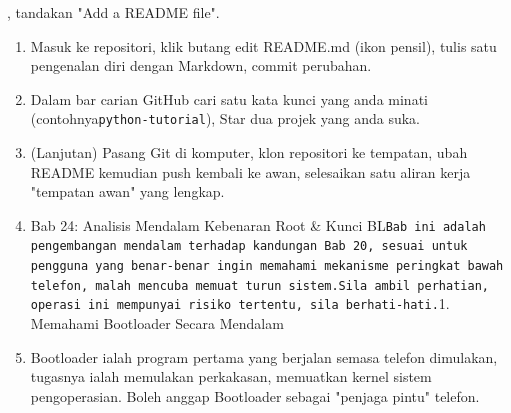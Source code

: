 \begin{tcbpractice}{, tandakan "Add a README file".}
\begin{enumerate}
  \item Masuk ke repositori, klik butang edit README.md (ikon pensil), tulis satu pengenalan diri dengan Markdown, commit perubahan.
  \item Dalam bar carian GitHub cari satu kata kunci yang anda minati (contohnya\texttt{python-\allowbreak tutorial}), Star dua projek yang anda suka.
  \item (Lanjutan) Pasang Git di komputer, klon repositori ke tempatan, ubah README kemudian push kembali ke awan, selesaikan satu aliran kerja "tempatan awan" yang lengkap.
  \item Bab 24: Analisis Mendalam Kebenaran Root \& Kunci BL\texttt{Bab ini adalah pengembangan mendalam terhadap kandungan Bab 20, sesuai untuk pengguna yang benar-\allowbreak benar ingin memahami mekanisme peringkat bawah telefon, malah mencuba memuat turun sistem.\allowbreak  Sila ambil perhatian, operasi ini mempunyai risiko tertentu, sila berhati-\allowbreak hati.\allowbreak }1. Memahami Bootloader Secara Mendalam
  \item Bootloader ialah program pertama yang berjalan semasa telefon dimulakan, tugasnya ialah memulakan perkakasan, memuatkan kernel sistem pengoperasian. Boleh anggap Bootloader sebagai "penjaga pintu" telefon.
\end{enumerate}

\end{tcbpractice}
